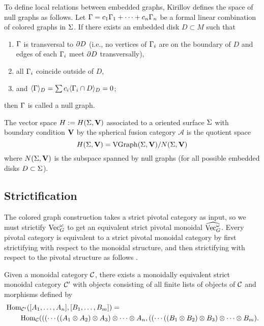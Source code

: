 To define local relations between embedded graphs, Kirillov defines the space of null graphs as follows. Let
$\Gamma=c_1\Gamma_1+\dots+c_n\Gamma_n$ be a formal linear
combination of colored graphs in $\Sigma$.  If there exists an embedded disk $D \subset M$ such that
\begin{enumerate}
  \item $\Gamma$ is transversal to $\partial D$ (i.e., no vertices of $\Gamma_i$ 
      are on the boundary of $D$ and edges of each $\Gamma_i$ meet 
      $\partial D$ transversally),
  \item all $\Gamma_i$ coincide outside of $D$,
  \item and $\langle\Gamma\rangle_D=\sum c_i\langle\Gamma_i\cap D\rangle_D=0$;
\end{enumerate}
then $\Gamma$ is called a null graph. 




\begin{defn}
The vector space $H := H(\Sigma, \mathbf{V})$ associated to a oriented surface $\Sigma$ with boundary condition $\mathbf{V}$ by the spherical fusion category $\mathcal A$ is the quotient space
 $$
   H(\Sigma, \mathbf{V})=\operatorname{VGraph}(\Sigma, \mathbf{V})/N(\Sigma, \mathbf{V})
  $$
  where $N(\Sigma, \mathbf{V})$ is  the subspace spanned by null graphs 
  (for all possible embedded disks  $D \subset \Sigma$). 
\end{defn}






\subsection{Strictification}
The colored graph construction takes a strict pivotal category as input, so we must strictify $\operatorname{Vec}_G^\omega$ to get an equivalent strict pivotal monoidal $\widehat {\operatorname{Vec}_G^\omega}$. Every pivotal category is equivalent to a strict pivotal monoidal category by first strictifying with respect to the monoidal structure, and then strictifying with respect to the pivotal structure as follows \cite{ns}.

Given a monoidal category $\mathcal{C}$, there exists a monoidally equivalent strict monoidal category $\mathcal{C}'$ with objects consisting of all finite lists of objects of $\mathcal{C}$ and morphisms defined by
\begin{align*}
& \operatorname{Hom}_{\mathcal{C}'}([A_1, \ldots, A_n], [B_1, \ldots, B_m]) = \\
& \qquad \operatorname{Hom}_{\mathcal{C}}(((\cdots((A_1 \otimes A_2) \otimes A_3) \otimes \cdots \otimes A_n, ((\cdots((B_1 \otimes B_2) \otimes B_3) \otimes \cdots \otimes B_m).
\end{align*}

